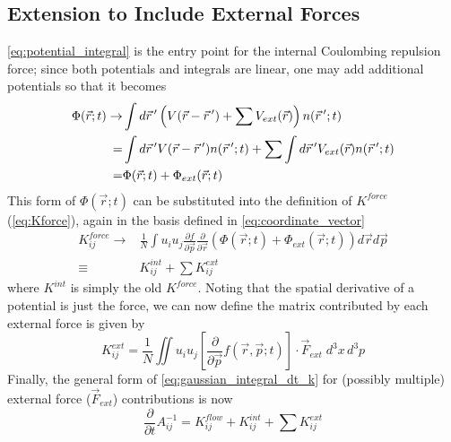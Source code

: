 
\subsection{Extension to Include External Forces} \label{sec:external_forces}

\ref{eq:potential_integral} is the entry point for the internal Coulombing repulsion force; since both potentials and integrals are linear, one may add additional potentials so that it becomes
\begin{equation}
  \begin{split}
    \Phi(\vec{r};t) \rightarrow & \int d\vec{r}\,^{\prime} \left( V(\vec{r} - \vec{r}\,^{\prime}) + \sum V_{ext}(\vec{r}) \right) n(\vec{r}\,^{\prime}; t) \\
    = & \int d\vec{r}\,^{\prime} V(\vec{r} - \vec{r}\,^{\prime}) n(\vec{r}\,^{\prime}; t) + \sum \int d\vec{r}\,^{\prime} V_{ext}(\vec{r}) n(\vec{r}\,^{\prime}; t) \\
    = & \Phi(\vec{r};t) + \Phi_{ext}(\vec{r};t)
  \end{split}
\end{equation}
This form of $\Phi(\vec{r};t)$ can be substituted into the definition of $K^{force}$ (\ref{eq:Kforce}), again in the basis defined in \ref{eq:coordinate_vector} 
\begin{equation}
  \begin{split}
    K^{force}_{ij} \rightarrow & \frac{1}{N} \int u_i u_j \frac{\partial f}{\partial \vec{p}} \frac{\partial}{\partial \vec{r}} \left( \Phi(\vec{r};t) + \Phi_{ext}(\vec{r};t) \right) d\vec{r} d\vec{p} \\
    \equiv & K^{int}_{ij} + \sum K^{ext}_{ij}
  \end{split}
\end{equation}
where $K^{int}$ is simply the old $K^{force}$. Noting that the spatial derivative of a potential is just the force, we can now define the matrix contributed by each external force is given by
\begin{equation}
  K^{ext}_{ij} = \frac{1}{N} \iint u_i u_j \left [ \frac{\partial}{\partial \vec{p}} f(\vec{r}, \vec{p}; t) \right ] \cdot \vec{F}_{ext}\;d^{3}x\,d^{3}p
\end{equation}
Finally, the general form of \ref{eq:gaussian_integral_dt_k} for (possibly multiple) external force ($\vec{F}_{ext}$) contributions is now
\begin{equation}
  \frac{\partial}{\partial t} A^{-1}_{ij} = K^{flow}_{ij} + K^{int}_{ij} + \sum K^{ext}_{ij}
\end{equation}

